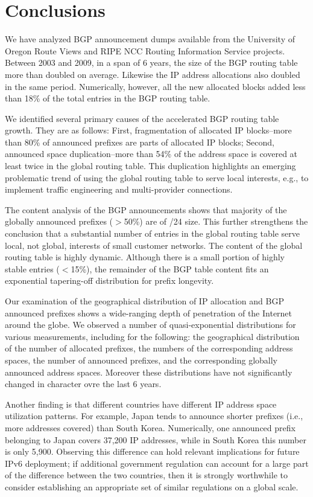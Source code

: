 \section{Conclusions}
\label{sec:conclusions}

We have analyzed BGP announcement dumps available from the University of Oregon
Route Views and RIPE NCC Routing Information Service projects. Between 2003 and
2009, in a span of 6 years, the size of the BGP routing table more than doubled
on average. Likewise the IP address allocations also doubled in the same
period. Numerically, however, all the new allocated blocks added less than 18\%
of the total entries in the BGP routing table.

We identified several primary causes of the accelerated BGP routing table
growth.  They are as follows: First, fragmentation of allocated IP blocks--more
than 80\% of announced prefixes are parts of allocated IP blocks; Second,
announced space duplication--more than 54\% of the address space is covered at
least twice in the global routing table. This duplication highlights an
emerging problematic trend of using the global routing table to serve local
interests, e.g., to implement traffic engineering and multi-provider
connections.

The content analysis of the BGP announcements shows that majority of the
globally announced prefixes ($>$50\%) are of /24 size. This further strengthens
the conclusion that a substantial number of entries in the global routing table
serve local, not global, interests of small customer networks. The content of
the global routing table is highly dynamic. Although there is a small portion
of highly stable entries ($<$15\%), the remainder of the BGP table content fits
an exponential tapering-off distribution for prefix longevity.

Our examination of the geographical distribution of IP allocation and BGP
announced prefixes shows a wide-ranging depth of penetration of the Internet
around the globe. We observed a number of quasi-exponential distributions for
various measurements, including for the following: the geographical
distribution of the number of allocated prefixes, the numbers of the
corresponding address spaces, the number of announced prefixes, and the
corresponding globally announced address spaces. Moreover these distributions
have not significantly changed in character ovre the last 6 years.

Another finding is that different countries have different IP address space
utilization patterns. For example, Japan tends to announce shorter prefixes
(i.e., more addresses covered) than South Korea. Numerically, one announced
prefix belonging to Japan covers 37,200 IP addresses, while in South Korea this
number is only 5,900. Observing this difference can hold relevant implications
for future IPv6 deployment; if additional government regulation can account for
a large part of the difference between the two countries, then it is strongly
worthwhile to consider establishing an appropriate set of similar regulations
on a global scale.
